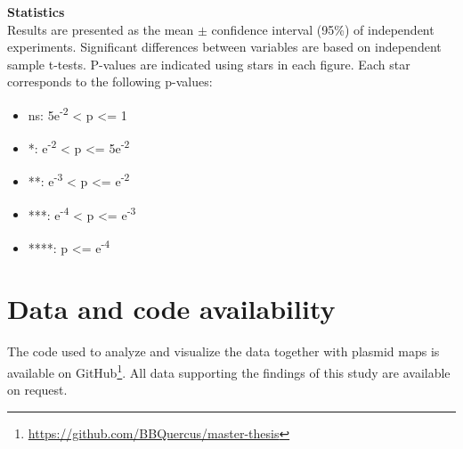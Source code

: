 \textbf{Statistics} \\
Results are presented as the mean $\pm$ confidence interval (95\%) of independent experiments.
Significant differences between variables are based on independent sample t-tests.
P-values are indicated using stars in each figure.
Each star corresponds to the following p-values:
\begin{itemize}
    \itemsep0em 
    \item ns: 5e\textsuperscript{-2} < p <= 1
    \item *: e\textsuperscript{-2} < p <= 5e\textsuperscript{-2}
    \item **: e\textsuperscript{-3} < p <= e\textsuperscript{-2}
    \item ***: e\textsuperscript{-4} < p <= e\textsuperscript{-3}
    \item ****: p <= e\textsuperscript{-4}
\end{itemize}

\section{Data and code availability}
The code used to analyze and visualize the data together with plasmid maps is available on GitHub\footnote{\href{https://github.com/BBQuercus/master-thesis}{https://github.com/BBQuercus/master-thesis}}.
All data supporting the findings of this study are available on request.